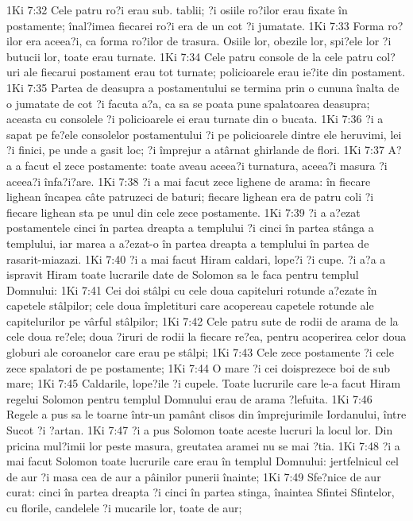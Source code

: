 1Ki 7:32  Cele patru ro?i erau sub. tablii; ?i osiile ro?ilor erau fixate în postamente; înal?imea fiecarei ro?i era de un cot ?i jumatate.
1Ki 7:33  Forma ro?ilor era aceea?i, ca forma ro?ilor de trasura. Osiile lor, obezile lor, spi?ele lor ?i butucii lor, toate erau turnate.
1Ki 7:34  Cele patru console de la cele patru col?uri ale fiecarui postament erau tot turnate; policioarele erau ie?ite din postament.
1Ki 7:35  Partea de deasupra a postamentului se termina prin o cununa înalta de o jumatate de cot ?i facuta a?a, ca sa se poata pune spalatoarea deasupra; aceasta cu consolele ?i policioarele ei erau turnate din o bucata.
1Ki 7:36  ?i a sapat pe fe?ele consolelor postamentului ?i pe policioarele dintre ele heruvimi, lei ?i finici, pe unde a gasit loc; ?i împrejur a atârnat ghirlande de flori.
1Ki 7:37  A?a a facut el zece postamente: toate aveau aceea?i turnatura, aceea?i masura ?i aceea?i înfa?i?are.
1Ki 7:38  ?i a mai facut zece lighene de arama: în fiecare lighean încapea câte patruzeci de baturi; fiecare lighean era de patru coli ?i fiecare lighean sta pe unul din cele zece postamente.
1Ki 7:39  ?i a a?ezat postamentele cinci în partea dreapta a templului ?i cinci în partea stânga a templului, iar marea a a?ezat-o în partea dreapta a templului în partea de rasarit-miazazi.
1Ki 7:40  ?i a mai facut Hiram caldari, lope?i ?i cupe. ?i a?a a ispravit Hiram toate lucrarile date de Solomon sa le faca pentru templul Domnului:
1Ki 7:41  Cei doi stâlpi cu cele doua capiteluri rotunde a?ezate în capetele stâlpilor; cele doua împletituri care acopereau capetele rotunde ale capitelurilor pe vârful stâlpilor;
1Ki 7:42  Cele patru sute de rodii de arama de la cele doua re?ele; doua ?iruri de rodii la fiecare re?ea, pentru acoperirea celor doua globuri ale coroanelor care erau pe stâlpi;
1Ki 7:43  Cele zece postamente ?i cele zece spalatori de pe postamente;
1Ki 7:44  O mare ?i cei doisprezece boi de sub mare;
1Ki 7:45  Caldarile, lope?ile ?i cupele. Toate lucrurile care le-a facut Hiram regelui Solomon pentru templul Domnului erau de arama ?lefuita.
1Ki 7:46  Regele a pus sa le toarne într-un pamânt clisos din împrejurimile Iordanului, între Sucot ?i ?artan.
1Ki 7:47  ?i a pus Solomon toate aceste lucruri la locul lor. Din pricina mul?imii lor peste masura, greutatea aramei nu se mai ?tia.
1Ki 7:48  ?i a mai facut Solomon toate lucrurile care erau în templul Domnului: jertfelnicul cel de aur ?i masa cea de aur a pâinilor punerii înainte;
1Ki 7:49  Sfe?nice de aur curat: cinci în partea dreapta ?i cinci în partea stinga, înaintea Sfintei Sfintelor, cu florile, candelele ?i mucarile lor, toate de aur;
